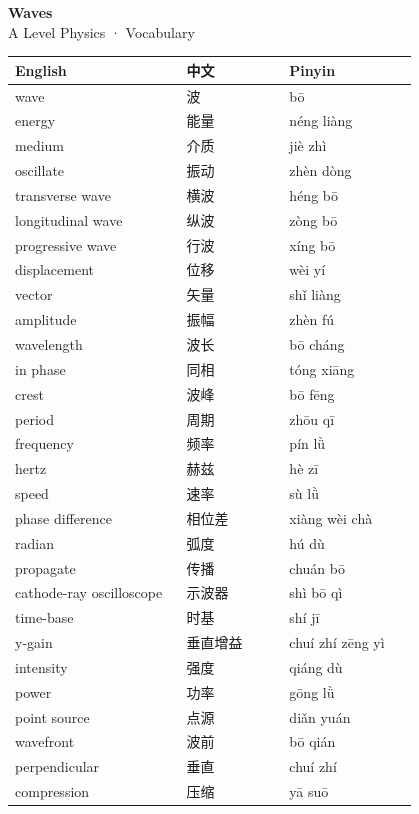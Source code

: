 \documentclass[11pt]{article}
\begin{document}
\begin{center}
  {\LARGE\bfseries Waves}\\[0.35em]
  {\large A Level Physics · Vocabulary}
\end{center}
\vspace{0.6em}

\begin{longtable}{@{}p{0.40\linewidth}p{0.24\linewidth}p{0.30\linewidth}@{}}
\toprule
\textbf{English} & \textbf{中文} & \textbf{Pinyin} \\
\midrule
\endhead
\bottomrule
\endlastfoot
wave & 波 & bō \\
energy & 能量 & néng liàng \\
medium & 介质 & jiè zhì \\
oscillate & 振动 & zhèn dòng \\
transverse wave & 横波 & héng bō \\
longitudinal wave & 纵波 & zòng bō \\
progressive wave & 行波 & xíng bō \\
displacement & 位移 & wèi yí \\
vector & 矢量 & shǐ liàng \\
amplitude & 振幅 & zhèn fú \\
wavelength & 波长 & bō cháng \\
in phase & 同相 & tóng xiāng \\
crest & 波峰 & bō fēng \\
period & 周期 & zhōu qī \\
frequency & 频率 & pín lǜ \\
hertz & 赫兹 & hè zī \\
speed & 速率 & sù lǜ \\
phase difference & 相位差 & xiàng wèi chà \\
radian & 弧度 & hú dù \\
propagate & 传播 & chuán bō \\
cathode-ray oscilloscope & 示波器 & shì bō qì \\
time-base & 时基 & shí jī \\
y-gain & 垂直增益 & chuí zhí zēng yì \\
intensity & 强度 & qiáng dù \\
power & 功率 & gōng lǜ \\
point source & 点源 & diǎn yuán \\
wavefront & 波前 & bō qián \\
perpendicular & 垂直 & chuí zhí \\
compression & 压缩 & yā suō \\

\end{longtable}
\end{document}
